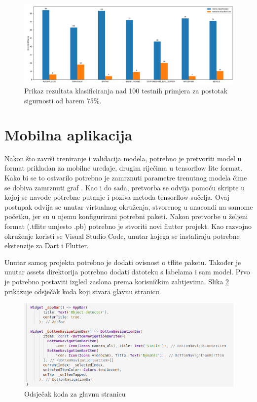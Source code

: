 \begin{figure}[htb]
    \centering
    \includegraphics[width=14cm]{img/Klas75.png}
    \caption{Prikaz rezultata klasificiranja nad 100 testnih primjera za postotak sigurnosti od barem 75\%.}
    \label{Klasifikacija75}
\end{figure}


\section{Mobilna aplikacija}
Nakon što završi treniranje i validacija modela, potrebno je pretvoriti model u format prikladan za mobilne uređaje, drugim riječima u tensorflow lite format. \newline Kako bi se to ostvarilo potrebno je 
zamrznuti parametre trenutnog modela čime se dobiva zamrznuti graf . Kao i do sada, pretvorba se odvija pomoću skripte u kojoj se navode potrebne putanje i poziva 
metoda tensorflow sučelja. Ovaj postupak odvija se unutar virtualnog okruženja, stvorenog u anacondi na samome početku, jer su u njemu konfigurirani potrebni paketi. Nakon pretvorbe u željeni format (.tflite umjesto .pb) potrebno 
je stvoriti novi flutter projekt. Kao razvojno okruženje koristi se Visual Studio Code, unutar kojega se instaliraju potrebne ekstenzije za Dart i Flutter. 

Unutar samog projekta potrebno je dodati ovisnost  o tflite paketu. Također je unutar assets direktorija potrebno dodati datoteku s labelama i sam model. 
Prvo je potrebno postaviti izgled zaslona prema korisničkim zahtjevima. Slika \ref{Flutter-main} prikazuje odsječak koda koji stvara glavnu stranicu.


\begin{figure}[htb]
    \centering
    \includegraphics[width=14cm]{img/flutter-main.png}
    \caption{Odsječak koda za glavnu stranicu}
    \label{Flutter-main}
\end{figure}

